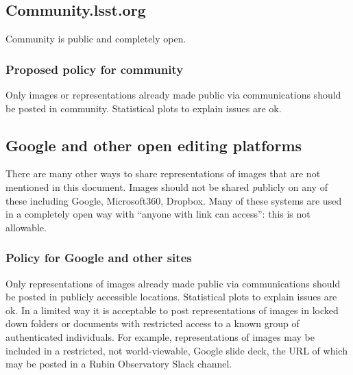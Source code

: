 \subsection{Community.lsst.org}
Community is public and completely open.
\subsubsection{Proposed policy for community}
Only images or representations already made public via communications should be posted in community.
Statistical plots to explain issues are ok.

\subsection{Google and other open editing platforms}
There are many other ways to share representations of images that are not mentioned in this document.
Images should not be shared {\emph publicly} on any of these including Google, Microsoft360, Dropbox.
Many of these systems are used in a completely open way with ``anyone with link can access'': this is not allowable.

\subsubsection{Policy for Google and other sites}
Only representations of images already made public via communications should be posted in publicly accessible locations.
Statistical plots to explain issues are ok.
In a limited way it is acceptable to post representations of images in locked down folders or documents with restricted access to a known group of authenticated individuals.
For example, representations of images may be included in a restricted, not world-viewable, Google slide deck, the URL of which may be posted in a Rubin Observatory Slack channel.

